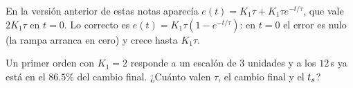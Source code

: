 \begin{cuidado}
En la versión anterior de estas notas aparecía $e(t)=K_1\tau+K_1\tau e^{-t/\tau}$, que vale $2K_1\tau$ en $t=0$. Lo correcto es $e(t)=K_1\tau(1-e^{-t/\tau})$: en $t=0$ el error es nulo (la rampa arranca en cero) y crece hasta $K_1\tau$.
\end{cuidado}

\begin{pausa}
Un primer orden con $K_1=2$ responde a un escalón de $3$ unidades y a los $12$\,s ya está en el $86.5\%$ del cambio final. ¿Cuánto valen $\tau$, el cambio final y el $t_s$?
\end{pausa}
